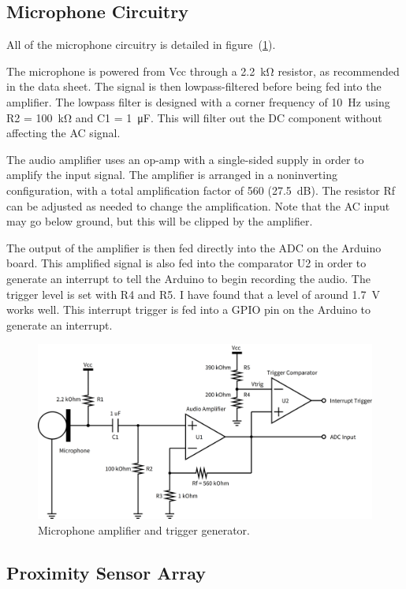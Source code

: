 \documentclass[10pt]{article}           %
\begin{document}
\subsection{Microphone Circuitry}
\label{sub:microphone_circuitry}

All of the microphone circuitry is detailed in figure~(\ref{fig:microphone}).

The microphone is powered from Vcc through a \SI{2.2}{\kilo\ohm} resistor,
as recommended in the data sheet. The signal is then lowpass-filtered before
being fed into the amplifier. The lowpass filter is designed with a corner
frequency of \SI{10}{\hertz} using R2 = \SI{100}{\kilo\ohm} and C1 =
\SI{1}{\micro\farad}. This will filter out the DC component without affecting
the AC signal.

The audio amplifier uses an op-amp with a single-sided supply in order to
amplify the input signal. The amplifier is arranged in a noninverting
configuration, with a total amplification factor of 560 (\SI{27.5}{\deci\bel}).
The resistor Rf can be adjusted as needed to change the amplification. Note
that the AC input may go below ground, but this will be clipped by the
amplifier.

The output of the amplifier is then fed directly into the ADC on the Arduino
board. This amplified signal is also fed into the comparator U2 in order to
generate an interrupt to tell the Arduino to begin recording the audio. The
trigger level is set with R4 and R5. I have found that a level of around
\SI{1.7}{\volt} works well. This interrupt trigger is fed into a GPIO pin on the
Arduino to generate an interrupt.

\begin{figure}[h]
    \centering
    \includegraphics[width=0.8\linewidth]{sch/microphone.png}
    \caption{Microphone amplifier and trigger generator.}
\label{fig:microphone}
\end{figure}

\subsection{Proximity Sensor Array}
\label{sub:proximity_sensor_array}
\end{document}
